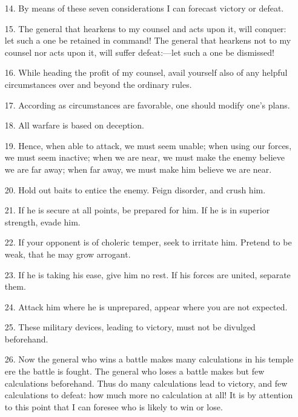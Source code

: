 \documentclass[11pt,openany]{memoir}
\newcommand{\enumeratemargin}{1.30em}
\begin{document}
\begin{enumerate}[leftmargin=\enumeratemargin]
\item[14.] By means of these seven considerations I can forecast victory or defeat.
\item[15.] The general that hearkens to my counsel and acts upon it, will conquer: let such a one be retained in command! The general that hearkens not to my counsel nor acts upon it, will suffer defeat:---let such a one be dismissed!
\item[16.] While heading the profit of my counsel, avail yourself also of any helpful circumstances over and beyond the ordinary rules.
\item[17.] According as circumstances are favorable, one should modify one's plans.
\item[18.] All warfare is based on deception.
\item[19.] Hence, when able to attack, we must seem unable; when using our forces, we must seem inactive; when we are near, we must make the enemy believe we are far away; when far away, we must make him believe we are near.
\item[20.] Hold out baits to entice the enemy. Feign disorder, and crush him.
\item[21.] If he is secure at all points, be prepared for him. If he is in superior strength, evade him.
\item[22.] If your opponent is of choleric temper, seek to irritate him. Pretend to be weak, that he may grow arrogant.
\item[23.] If he is taking his ease, give him no rest. If his forces are united, separate them.
\item[24.] Attack him where he is unprepared, appear where you are not expected.
\item[25.] These military devices, leading to victory, must not be divulged beforehand.
\item[26.] Now the general who wins a battle makes many calculations in his temple ere the battle is fought. The general who loses a battle makes but few calculations beforehand. Thus do many calculations lead to victory, and few calculations to defeat: how much more no calculation at all! It is by attention to this point that I can foresee who is likely to win or lose.
\end{enumerate}
\end{document}
